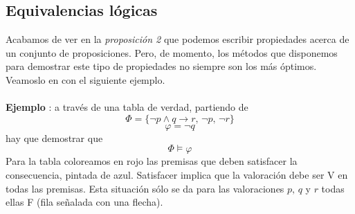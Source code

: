 \subsection{Equivalencias lógicas}\label{sec:equivalencias}
Acabamos de ver en la \textit{proposición 2} que podemos escribir propiedades acerca de un conjunto de proposiciones. Pero, de momento, los métodos que disponemos para demostrar este tipo de propiedades no siempre son los más óptimos. Veamoslo en con el siguiente ejemplo.
\paragraph{}
\addtocounter{ej}{1} %
\textbf{Ejemplo }: a través de una tabla de verdad, partiendo de 
\[ \Phi=\{ \neg p \wedge q \rightarrow r,\, \neg p,\, \neg r \} \]
\[ \varphi= \neg q\]
hay que demostrar que 
\[ \Phi \models \varphi \]
Para la tabla coloreamos en rojo las premisas que deben satisfacer la consecuencia, pintada de azul. Satisfacer implica que la valoración debe ser V en todas las premisas. Esta situación sólo se da para las valoraciones $p, \, q$ y $r$ todas ellas F (fila señalada con una flecha). 

